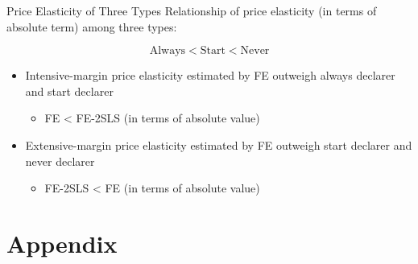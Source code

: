 \documentclass[
  ignorenonframetext,
  aspectratio=169,
]{beamer}
\providecommand{\tightlist}{%
  \setlength{\itemsep}{0pt}\setlength{\parskip}{0pt}}
\begin{document}
\begin{frame}{Price Elasticity of Three Types}
\protect\hypertarget{price-elasticity-of-three-types-1}{}
Relationship of price elasticity
(in terms of absolute term) among three types:

\[ \text{Always} < \text{Start} < \text{Never} \]

\begin{itemize}
\tightlist
\item
  Intensive-margin price elasticity estimated by FE
  outweigh always declarer and start declarer

  \begin{itemize}
  \tightlist
  \item
    FE \textless{} FE-2SLS (in terms of absolute value)
  \end{itemize}
\item
  Extensive-margin price elasticity estimated by FE
  outweigh start declarer and never declarer

  \begin{itemize}
  \tightlist
  \item
    FE-2SLS \textless{} FE (in terms of absolute value)
  \end{itemize}
\end{itemize}
\end{frame}

\hypertarget{appendix}{%
\section{Appendix}\label{appendix}}
\end{document}
